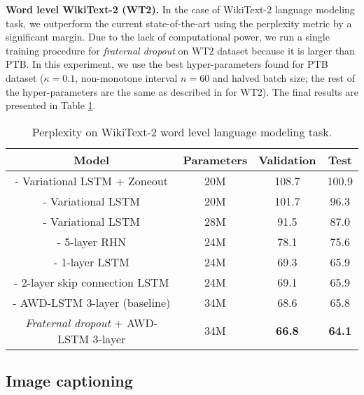 \documentclass{article} %
\begin{document}
\textbf{Word level WikiText-2 (WT2).} In the case of WikiText-2 language modeling task, we outperform the current state-of-the-art using the perplexity metric by a significant margin. Due to the lack of computational power, we run a single training procedure for \emph{fraternal dropout} on WT2 dataset because it is larger than PTB. In this experiment, we use the best hyper-parameters found for PTB dataset ($\kappa = 0.1$, non-monotone interval $n=60$ and halved batch size; the rest of the hyper-parameters are the same as described in \cite{melis2017state} for WT2). The final results are presented in Table \ref{table:WT234Mfnt}.

\begin{table}[t]
\vspace{-0.08cm}
\centering
\begin{tabular}{c | c c c} 
\textbf{Model} & \textbf{Parameters}  & \textbf{Validation} & \textbf{Test}\\
\hline
\cite{DBLP:journals/corr/MerityXBS16} - Variational LSTM + Zoneout & 20M & 108.7 & 100.9\\
\cite{DBLP:journals/corr/MerityXBS16} - Variational LSTM & 20M & 101.7 & 96.3\\
\cite{inan2016tying} - Variational LSTM & 28M & 91.5 & 87.0\\
\cite{melis2017state} - 5-layer RHN & 24M & 78.1 & 75.6\\
\cite{melis2017state} - 1-layer LSTM & 24M & 69.3 & 65.9\\
\cite{melis2017state} - 2-layer skip connection LSTM & 24M & 69.1 & 65.9\\
\hline
\cite{merity2017regularizing} - AWD-LSTM 3-layer (baseline) & 34M & 68.6 & 65.8\\
\hline
\emph{Fraternal dropout} + AWD-LSTM 3-layer & 34M & \textbf{66.8} & \textbf{64.1}\\
\end{tabular}
\caption{Perplexity on WikiText-2 word level language modeling task.}
\label{table:WT234Mfnt}
\vspace{-0.08cm}
\end{table}



\subsection{Image captioning}
\end{document}
